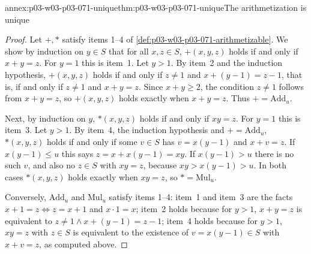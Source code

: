 \begin{annexitem}{annex:p03-w03-p03-071-unique}{thm:p03-w03-p03-071-unique}{The arithmetization is unique}
\begin{proof}
Let \(+,\ast\) satisfy items 1--4 of
\cref{def:p03-w03-p03-071-arithmetizable}.  We show by induction on
\(y\in S\) that for all \(x,z\in S\), \(+(x,y,z)\) holds if and only if
\(x+y=z\).  For \(y=1\) this is item~1.  Let \(y>1\).  By item~2 and the
induction hypothesis, \(+(x,y,z)\) holds if and only if \(z\neq1\) and
\(x+(y-1)=z-1\), that is, if and only if \(z\neq1\) and \(x+y=z\).  Since
\(x+y\geq2\), the condition \(z\neq1\) follows from \(x+y=z\), so
\(+(x,y,z)\) holds exactly when \(x+y=z\).  Thus \(+=\mathrm{Add}_u\).

Next, by induction on \(y\), \(\ast(x,y,z)\) holds if and only if \(xy=z\).
For \(y=1\) this is item~3.  Let \(y>1\).  By item~4, the induction
hypothesis and \(+=\mathrm{Add}_u\), \(\ast(x,y,z)\) holds if and only if
some \(v\in S\) has \(v=x(y-1)\) and \(x+v=z\).  If \(x(y-1)\leq u\) this says
\(z=x+x(y-1)=xy\).  If \(x(y-1)>u\) there is no such \(v\), and also no
\(z\in S\) with \(xy=z\), because \(xy>x(y-1)>u\).  In both cases
\(\ast(x,y,z)\) holds exactly when \(xy=z\), so \(\ast=\mathrm{Mul}_u\).

Conversely, \(\mathrm{Add}_u\) and \(\mathrm{Mul}_u\) satisfy items 1--4: item~1
and item~3 are the facts \(x+1=z\iff z=x+1\) and \(x\cdot1=x\); item~2
holds because for \(y>1\), \(x+y=z\) is equivalent to \(z\neq1\wedge
x+(y-1)=z-1\); item~4 holds because for \(y>1\), \(xy=z\) with \(z\in S\) is
equivalent to the existence of \(v=x(y-1)\in S\) with \(x+v=z\), as computed
above.
\end{proof}
\end{annexitem}

